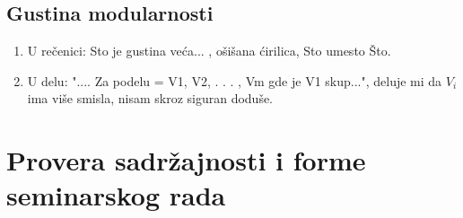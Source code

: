 \documentclass[a4paper]{report}
\begin{document}
\subsection{Gustina modularnosti}
\begin{enumerate}
  \item U  rečenici: Sto je gustina veća... , ošišana ćirilica, Sto umesto Što.
  \item U delu: ".... Za podelu  = {V1, V2, . . . , Vm} gde je V1 skup...", deluje mi da $V_i$ ima više smisla, nisam skroz siguran doduše.
\end{enumerate}



\section{Provera sadržajnosti i forme seminarskog rada}
\end{document}
